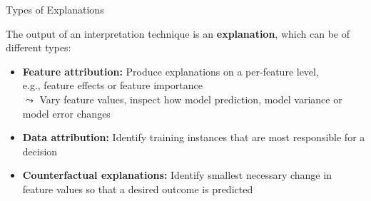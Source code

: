 \documentclass[11pt,compress,t,notes=noshow, aspectratio=169, xcolor=table]{beamer}
\begin{document}
\begin{frame}{Types of Explanations}

	The output of an interpretation technique is an \textbf{explanation}, which can be of different types:

    \medskip

	\begin{itemize}
  \itemsep1em
	\item
		\textbf{Feature attribution:} Produce explanations on a per-feature level, \\
		e.g., feature effects or feature importance
		\\
		$\leadsto$ Vary feature values, inspect how model prediction, model variance or model error changes
\pause
	\item
		\textbf{Data attribution:}
		Identify training instances that are most responsible for a decision
\pause
	\item
	   \textbf{Counterfactual explanations:}
	   Identify smallest necessary change in feature values so that a desired outcome is predicted
	   \\

	\end{itemize}

\end{frame}
\end{document}
